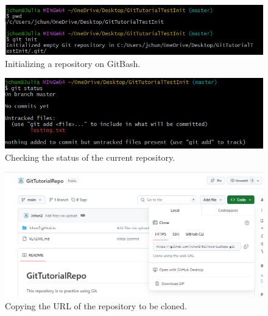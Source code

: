 \documentclass[10pt,twocolumn]{article}
\begin{document}
\begin{figure}
    \centering
    \includegraphics[width=.95\linewidth]{Gitinitnew.png}
    \caption{
        Initializing a repository on GitBash. 
    }
    \label{Figure 1}
\end{figure} 

\begin{figure}
    \centering
    \includegraphics[width=.95\linewidth]{Gitstatus.png}
    \caption{
        Checking the status of the current repository.  
    }
    \label{Figure 2}
\end{figure}
\begin{figure}
    \centering
    \includegraphics[width=.95\linewidth]{GitCloning.png}
    \caption{
        Copying the URL of the repository to be cloned. 
    }
    \label{Figure 3}
\end{figure}

 
\end{document}
